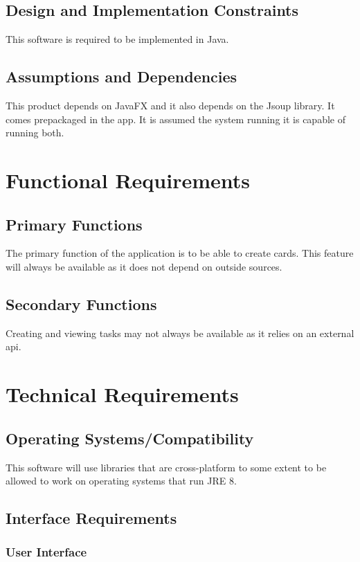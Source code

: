 \documentclass[12pt]{article}
\begin{document}
\subsection{Design and Implementation Constraints}

This software is required to be implemented in Java. 
\subsection{Assumptions and Dependencies}
This product depends on JavaFX and it also depends on the Jsoup library. It comes prepackaged in the app. It is assumed the system running it is capable of running both.

\section{Functional Requirements}

\subsection{Primary Functions}
The primary function of the application is to be able to create cards. This feature will always be available as it does not depend on outside sources.
\subsection{Secondary Functions}
Creating and viewing tasks may not always be available as it relies on an external api.
\section{Technical Requirements}
\subsection{Operating Systems/Compatibility}

This software will use libraries that are cross-platform to some extent
to be allowed to work on operating systems that run JRE 8.

\subsection{Interface Requirements}

\subsubsection{User Interface}\label{user-interface}
\end{document}

